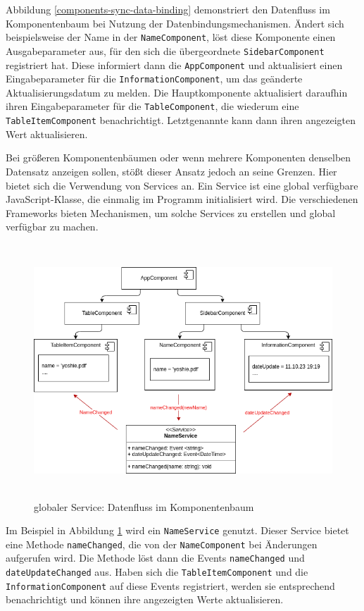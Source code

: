 \documentclass[12pt]{book}          %
\begin{document}
Abbildung \ref{components-sync-data-binding} demonstriert den Datenfluss im Komponentenbaum bei Nutzung der Datenbindungsmechanismen. Ändert sich beispielsweise der Name in der \texttt{NameComponent}, löst diese Komponente einen Ausgabeparameter aus, für den sich die übergeordnete \texttt{SidebarComponent} registriert hat. Diese informiert dann die \texttt{AppComponent} und aktualisiert einen Eingabeparameter für die \texttt{InformationComponent}, um das geänderte Aktualisierungsdatum zu melden. Die Hauptkomponente aktualisiert daraufhin ihren Eingabeparameter für die \texttt{TableComponent}, die wiederum eine \texttt{TableItemComponent} benachrichtigt. Letztgenannte kann dann ihren angezeigten Wert aktualisieren.

Bei größeren Komponentenbäumen oder wenn mehrere Komponenten denselben Datensatz anzeigen sollen, stößt dieser Ansatz jedoch an seine Grenzen. Hier bietet sich die Verwendung von Services an. Ein Service ist eine global verfügbare JavaScript-Klasse, die einmalig im Programm initialisiert wird. Die verschiedenen Frameworks bieten Mechanismen, um solche Services zu erstellen und global verfügbar zu machen.


\begin{figure}[htbp]
\centering
\includegraphics[height=9.5cm]{abbildungen/components-sync-service.png}
\caption{globaler Service: Datenfluss im Komponentenbaum}
\label{components-sync-service}
\end{figure}

Im Beispiel in Abbildung \ref{components-sync-service} wird ein \texttt{NameService} genutzt. Dieser Service bietet eine Methode \texttt{nameChanged}, die von der \texttt{NameComponent} bei Änderungen aufgerufen wird. Die Methode löst dann die Events \texttt{nameChanged} und \texttt{dateUpdateChanged} aus. Haben sich die \texttt{TableItemComponent} und die \texttt{InformationComponent} auf diese Events registriert, werden sie entsprechend benachrichtigt und können ihre angezeigten Werte aktualisieren.
\end{document}
